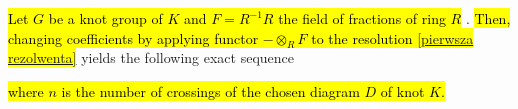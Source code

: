   \begin{proposition}\label{proposition o wygladzie resolution}
  \hl{Let $G$ be a knot group of $K$ and $F=R^{-1}R$ the field of fractions of ring $R$} \cite{atiyah}. \hl{Then, changing coefficients by applying functor $-\otimes_R F$ to the resolution \eqref{pierwsza rezolwenta}}
  yields the following exact sequence
  \begin{center}
  \end{center}
  \hl{where $n$ is the number of crossings of the chosen diagram $D$ of knot $K$.}
\end{proposition}

